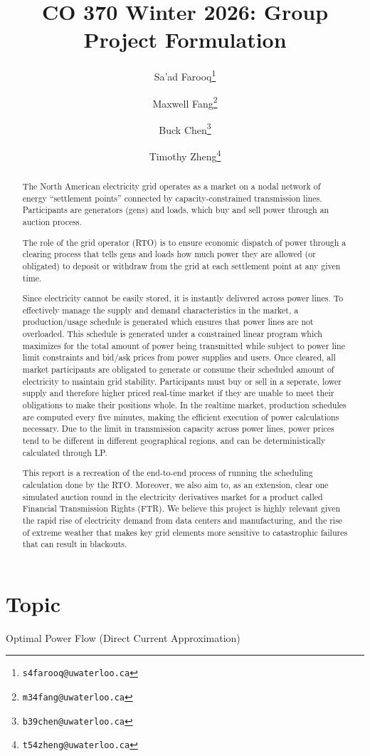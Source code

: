 \documentclass[11pt]{article}
\title{CO 370 Winter 2026: Group Project Formulation}
\author{
Sa'ad Farooq\thanks{\texttt{s4farooq@uwaterloo.ca}} \and
Maxwell Fang\thanks{\texttt{m34fang@uwaterloo.ca}} \and
Buck Chen\thanks{\texttt{b39chen@uwaterloo.ca}} \and
Timothy Zheng\thanks{\texttt{t54zheng@uwaterloo.ca}}
}
\begin{document}
\maketitle
\vspace{-1.75em}

\section{Topic}
\begin{center}
Optimal Power Flow (Direct Current Approximation)
\end{center}

\begin{abstract}
The North American electricity grid operates as a market on a nodal network of energy ``settlement points'' connected by capacity-constrained transmission lines. Participants are generators (gens) and loads, which buy and sell power through an auction process.

The role of the grid operator (RTO) is to ensure economic dispatch of power through a clearing process that tells gens and loads how much power they are allowed (or obligated) to deposit or withdraw from the grid at each settlement point at any given time. 

Since electricity cannot be easily stored, it is instantly delivered across power lines. To effectively manage the supply and demand characteristics in the market, a production/usage schedule is generated which ensures that power lines are not overloaded. This schedule is generated under a constrained linear program which maximizes for the total amount of power being transmitted while subject to power line limit constraints and bid/ask prices from power supplies and users. Once cleared, all market participants are obligated to generate or consume their scheduled amount of electricity to maintain grid stability. Participants must buy or sell in a seperate, lower supply and therefore higher priced real-time market if they are unable to meet their obligations to make their positions whole. In the realtime market, production schedules are computed every five minutes, making the efficient execution of power calculations necessary. Due to the limit in transmission capacity across power lines, power prices tend to be different in different geographical regions, and can be deterministically calculated through LP. 

This report is a recreation of the end-to-end process of running the scheduling calculation done by the RTO. Moreover, we also aim to, as an extension, clear one simulated auction round in the electricity derivatives market for a product called Financial Transmission Rights (FTR). We believe this project is highly relevant given the rapid rise of electricity demand from data centers and manufacturing, and the rise of extreme weather that makes key grid elements more sensitive to catastrophic failures that can result in blackouts.
\end{abstract}
\end{document}
